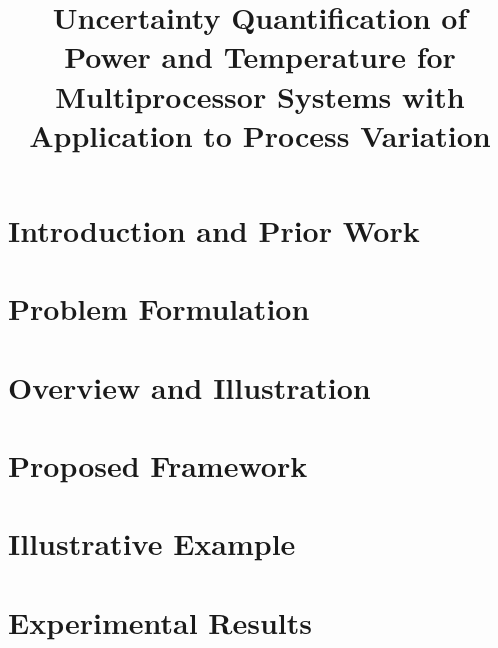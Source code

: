 \documentclass{sig-alternate}
\begin{document}
  \title{Uncertainty Quantification of Power and Temperature for Multiprocessor Systems with Application to Process Variation}

  \maketitle

  \begin{abstract}
    
  \end{abstract}

  \section{Introduction and Prior Work} 
  

  \vspace{-0.5em}
  \section{Problem Formulation}    
  

  \section{Overview and Illustration} 
  

  \vspace{-0.5em}
  \section{Proposed Framework} 
  

  \vspace{-0.5em}
  \section{Illustrative Example} 
  

  \section{Experimental Results} 
  
\end{document}
